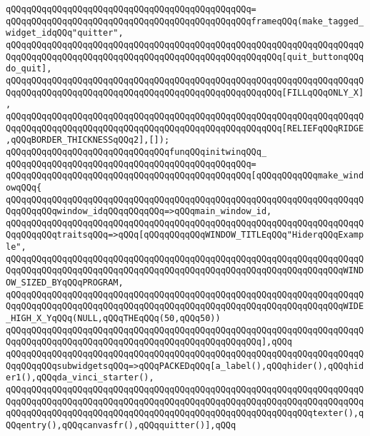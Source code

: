 \verb|qQQqqQQqqQQqqQQqqQQqqQQqqQQqqQQqqQQqqQQqqQQqqQQq=|\newline
\verb|qQQqqQQqqQQqqQQqqQQqqQQqqQQqqQQqqQQqqQQqqQQqqQQqframeqQQq(make_tagged_widget_idqQQq"quitter",|\newline
\verb|qQQqqQQqqQQqqQQqqQQqqQQqqQQqqQQqqQQqqQQqqQQqqQQqqQQqqQQqqQQqqQQqqQQqqQQqqQQqqQQqqQQqqQQqqQQqqQQqqQQqqQQqqQQqqQQqqQQqqQQqqQQq[quit_buttonqQQqdo_quit],|\newline
\verb|qQQqqQQqqQQqqQQqqQQqqQQqqQQqqQQqqQQqqQQqqQQqqQQqqQQqqQQqqQQqqQQqqQQqqQQqqQQqqQQqqQQqqQQqqQQqqQQqqQQqqQQqqQQqqQQqqQQqqQQqqQQq[FILLqQQqONLY_X],|\newline
\verb|qQQqqQQqqQQqqQQqqQQqqQQqqQQqqQQqqQQqqQQqqQQqqQQqqQQqqQQqqQQqqQQqqQQqqQQqqQQqqQQqqQQqqQQqqQQqqQQqqQQqqQQqqQQqqQQqqQQqqQQqqQQq[RELIEFqQQqRIDGE,qQQqBORDER_THICKNESSqQQq2],[]);|\newline
\newline
\verb|qQQqqQQqqQQqqQQqqQQqqQQqqQQqqQQqfunqQQqinitwinqQQq_|\newline
\verb|qQQqqQQqqQQqqQQqqQQqqQQqqQQqqQQqqQQqqQQqqQQqqQQq=|\newline
\verb|qQQqqQQqqQQqqQQqqQQqqQQqqQQqqQQqqQQqqQQqqQQqqQQq[qQQqqQQqqQQqmake_windowqQQq{|\newline
\verb|qQQqqQQqqQQqqQQqqQQqqQQqqQQqqQQqqQQqqQQqqQQqqQQqqQQqqQQqqQQqqQQqqQQqqQQqqQQqqQQqwindow_idqQQqqQQqqQQq=>qQQqmain_window_id,|\newline
\verb|qQQqqQQqqQQqqQQqqQQqqQQqqQQqqQQqqQQqqQQqqQQqqQQqqQQqqQQqqQQqqQQqqQQqqQQqqQQqqQQqtraitsqQQq=>qQQq[qQQqqQQqqQQqWINDOW_TITLEqQQq"HiderqQQqExample",|\newline
\verb|qQQqqQQqqQQqqQQqqQQqqQQqqQQqqQQqqQQqqQQqqQQqqQQqqQQqqQQqqQQqqQQqqQQqqQQqqQQqqQQqqQQqqQQqqQQqqQQqqQQqqQQqqQQqqQQqqQQqqQQqqQQqqQQqqQQqqQQqWINDOW_SIZED_BYqQQqPROGRAM,|\newline
\verb|qQQqqQQqqQQqqQQqqQQqqQQqqQQqqQQqqQQqqQQqqQQqqQQqqQQqqQQqqQQqqQQqqQQqqQQqqQQqqQQqqQQqqQQqqQQqqQQqqQQqqQQqqQQqqQQqqQQqqQQqqQQqqQQqqQQqqQQqWIDE_HIGH_X_YqQQq(NULL,qQQqTHEqQQq(50,qQQq50))|\newline
\verb|qQQqqQQqqQQqqQQqqQQqqQQqqQQqqQQqqQQqqQQqqQQqqQQqqQQqqQQqqQQqqQQqqQQqqQQqqQQqqQQqqQQqqQQqqQQqqQQqqQQqqQQqqQQqqQQqqQQqqQQq],qQQq|\newline
\verb|qQQqqQQqqQQqqQQqqQQqqQQqqQQqqQQqqQQqqQQqqQQqqQQqqQQqqQQqqQQqqQQqqQQqqQQqqQQqqQQqsubwidgetsqQQq=>qQQqPACKEDqQQq[a_label(),qQQqhider(),qQQqhider1(),qQQqda_vinci_starter(),|\newline
\verb|qQQqqQQqqQQqqQQqqQQqqQQqqQQqqQQqqQQqqQQqqQQqqQQqqQQqqQQqqQQqqQQqqQQqqQQqqQQqqQQqqQQqqQQqqQQqqQQqqQQqqQQqqQQqqQQqqQQqqQQqqQQqqQQqqQQqqQQqqQQqqQQqqQQqqQQqqQQqqQQqqQQqqQQqqQQqqQQqqQQqqQQqqQQqqQQqqQQqqQQqtexter(),qQQqentry(),qQQqcanvasfr(),qQQqquitter()],qQQq|\newline
